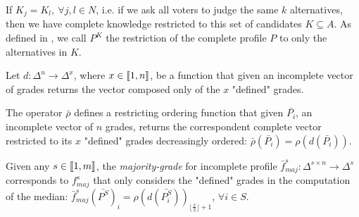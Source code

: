 \documentclass[version=3.21, pagesize, twoside=off, bibliography=totoc, DIV=calc, fontsize=12pt, a4paper]{scrartcl}
\begin{document}
If $K_j=K_l, \ \forall j,l\in N$, i.e. 
if we ask all voters to judge the same $k$ alternatives, then we have complete knowledge restricted to this set of candidates $K \subseteq A$. As defined in , we call $P^{K}$ the restriction of the complete profile $P$ to only the alternatives in $K$.


Let $d:\Delta^{n}\rightarrow \Delta^{x}$, where $x \in \llbracket1,n\rrbracket$, be a function that given an incomplete vector of grades returns the vector composed only of the $x$ "defined" grades. 

The operator $\bar{\rho}$ defines a restricting ordering function that given $\bar{P_i}$, an incomplete vector of $n$ grades, returns the correspondent complete vector restricted to its $x$ "defined" grades decreasingly ordered: $\bar{\rho}(\bar{P_i})=\rho(d(\bar{P_i}))$. 

Given any $s \in \llbracket1,m\rrbracket$, the \emph{majority-grade} for incomplete profile $\bar{f}^s_{maj}: \Delta^{s \times n} \rightarrow \Delta^s$ corresponds to $f^s_{maj}$ that only considers the "defined" grades in the computation of the median: $\bar{f}^s_{maj}(\bar{P^S})_i = \rho(d(\bar{P^S_i}))_{\lfloor \frac{x}{2} \rfloor + 1}$, $\forall i \in S$.  
\end{document}

